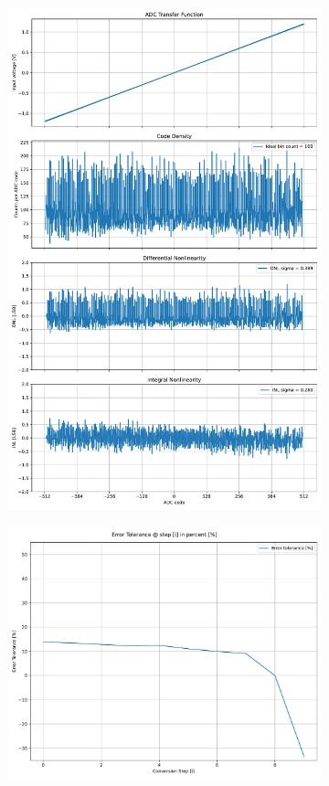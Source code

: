 \documentclass[varwidth]{standalone}
\begin{document}
\begin{figure}
\begin{subfigure}{0.32\textwidth}
    \includegraphics[width=\textwidth]{behavioral_10b_noisy_radix175_nonlinearity.pdf}
\end{subfigure}
\begin{subfigure}{0.32\textwidth}
    \includegraphics[width=\textwidth]{behavioral_10b_noisy_radix175_redundancy.pdf}

\end{subfigure}
\end{figure}
\end{document}
